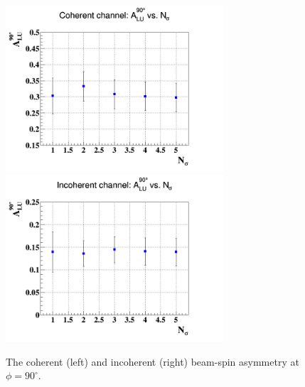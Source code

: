 \begin{figure}[tbp]
   \includegraphics[height=6.2cm]{fig/coh_Alu_Nsig.png}
   \includegraphics[height=6.2cm]{fig/incoh_Alu_Nsig.png}
   \caption{The coherent (left) and incoherent (right) beam-spin asymmetry at 
$\phi = 90 ^{\circ}$. }
\label{fig:sys_fit_Alu}
\end{figure}
  
